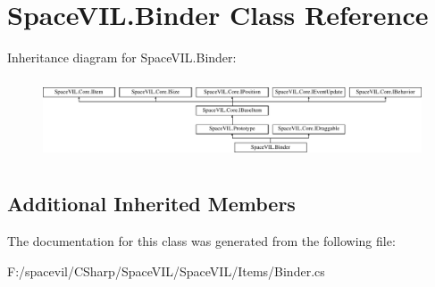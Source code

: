 \hypertarget{class_space_v_i_l_1_1_binder}{}\section{Space\+V\+I\+L.\+Binder Class Reference}
\label{class_space_v_i_l_1_1_binder}
Inheritance diagram for Space\+V\+I\+L.\+Binder\+:\begin{figure}[H]
\begin{center}
\leavevmode
\includegraphics[height=2.421622cm]{class_space_v_i_l_1_1_binder}
\end{center}
\end{figure}
\subsection*{Additional Inherited Members}


The documentation for this class was generated from the following file\+:\begin{DoxyCompactItemize}
\item 
F\+:/spacevil/\+C\+Sharp/\+Space\+V\+I\+L/\+Space\+V\+I\+L/\+Items/Binder.\+cs\end{DoxyCompactItemize}
